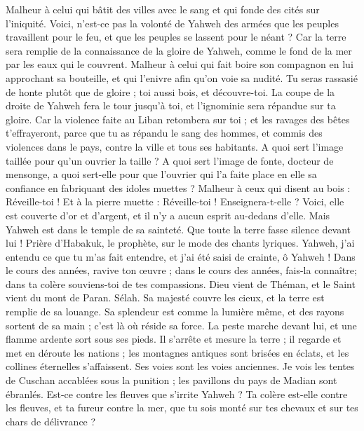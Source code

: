 \begin{multicols}{2}
Malheur à celui qui bâtit des villes avec le sang et qui fonde des cités sur l'iniquité.
Voici, n'est-ce pas la volonté de Yahweh des armées que les peuples travaillent pour le feu, et que les peuples se lassent pour le néant ?
Car la terre sera remplie de la connaissance de la gloire de Yahweh, comme le fond de la mer par les eaux qui le couvrent.
Malheur à celui qui fait boire son compagnon en lui approchant sa bouteille, et qui l’enivre afin qu'on voie sa nudité.
Tu seras rassasié de honte plutôt que de gloire ; toi aussi bois, et découvre-toi. La coupe de la droite de Yahweh fera le tour jusqu’à toi, et l'ignominie sera répandue sur ta gloire.
Car la violence faite au Liban retombera sur toi ; et les ravages des bêtes t’effrayeront, parce que tu as répandu le sang des hommes, et commis  des violences dans le pays, contre la ville et tous ses habitants.
A quoi sert l'image taillée  pour qu’un ouvrier la taille ? A quoi sert l’image de fonte, docteur de mensonge, a quoi sert-elle pour que l'ouvrier qui l’a faite place en elle sa confiance en fabriquant des idoles muettes ?
Malheur à ceux qui disent au bois : Réveille-toi ! Et à la pierre muette : Réveille-toi ! Enseignera-t-elle ? Voici, elle est couverte d'or et d'argent, et il n'y a aucun esprit au-dedans d’elle.
Mais Yahweh est dans le temple de sa sainteté. Que toute la terre fasse silence devant lui !
\VerseOne{}Prière d'Habakuk, le prophète, sur le mode des chants lyriques.
Yahweh, j'ai entendu ce que tu m'as fait entendre, et j'ai été saisi de crainte, ô Yahweh ! Dans le cours des années, ravive ton œuvre ; dans le cours des années, fais-la connaître; dans ta colère souviens-toi de tes compassions.
Dieu vient de Théman, et le Saint vient du mont de Paran. Sélah. Sa majesté couvre les cieux, et la terre est remplie de sa louange.
Sa splendeur est comme la lumière même, et des rayons sortent de sa main ; c'est là où réside sa force.
La peste marche devant lui, et une  flamme ardente sort sous ses pieds.
Il s'arrête et mesure la terre ; il regarde et met en déroute les nations ; les montagnes antiques sont  brisées en éclats,  et les collines éternelles s’affaissent. Ses voies sont les voies anciennes.
Je vois les tentes de Cuschan accablées sous la punition ; les pavillons du pays de Madian sont ébranlés.
Est-ce contre les fleuves que s’irrite Yahweh ? Ta colère est-elle contre les fleuves, et ta fureur contre la mer, que tu sois monté sur tes chevaux et sur tes chars de délivrance ?

\end{multicols}
